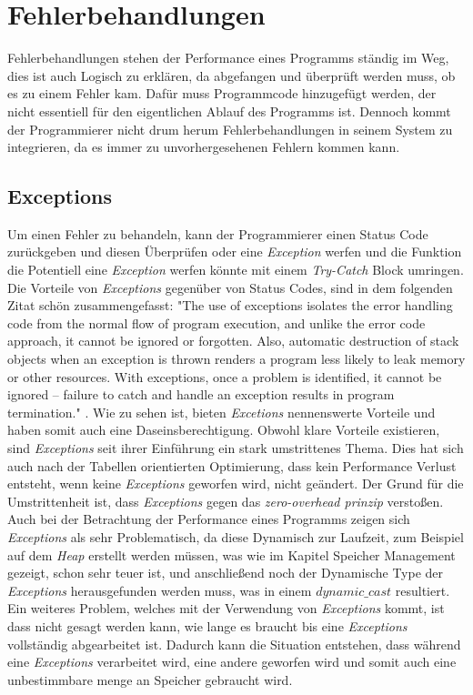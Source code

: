 \section{Fehlerbehandlungen}
Fehlerbehandlungen stehen der Performance eines Programms ständig im Weg, dies ist auch Logisch zu erklären, da abgefangen und überprüft werden muss, ob es zu einem Fehler kam. Dafür muss Programmcode hinzugefügt werden, der nicht essentiell für den eigentlichen Ablauf des Programms ist. Dennoch kommt der Programmierer nicht drum herum Fehlerbehandlungen in seinem System zu integrieren, da es immer zu unvorhergesehenen Fehlern kommen kann.

\subsection{Exceptions}
Um einen Fehler zu behandeln, kann der Programmierer einen Status Code zurückgeben und diesen Überprüfen oder eine \emph{Exception} werfen und die Funktion die Potentiell eine \emph{Exception} werfen könnte mit einem \emph{Try-Catch} Block umringen. Die Vorteile von \emph{Exceptions} gegenüber von Status Codes, sind in dem folgenden Zitat schön zusammengefasst: "The use of exceptions isolates the error handling code from the normal flow of program execution, and unlike the error code approach, it cannot be ignored or forgotten. Also, automatic destruction of stack objects when an exception is thrown renders a program less likely to leak memory or other resources. With exceptions, once a problem is identified, it cannot be ignored – failure to catch and handle an exception results in program termination." \cite{TechnicalReport}. Wie zu sehen ist, bieten \emph{Excetions} nennenswerte Vorteile und haben somit auch eine Daseinsberechtigung.
\newline
\newline
Obwohl klare Vorteile existieren, sind \emph{Exceptions} seit ihrer Einführung ein stark umstrittenes Thema. Dies hat sich auch nach der Tabellen orientierten Optimierung, dass kein Performance Verlust entsteht, wenn keine \emph{Exceptions} geworfen wird, nicht geändert. Der Grund für die Umstrittenheit ist, dass \emph{Exceptions} gegen das \emph{zero-overhead prinzip} verstoßen. Auch bei der Betrachtung der Performance eines Programms zeigen sich \emph{Exceptions} als sehr Problematisch, da  diese Dynamisch zur Laufzeit, zum Beispiel auf dem \emph{Heap} erstellt werden müssen, was wie im Kapitel Speicher Management gezeigt, schon sehr teuer ist, und anschließend noch der Dynamische Type der \emph{Exceptions} herausgefunden werden muss, was in einem \emph{$dynamic\_cast$} resultiert. Ein weiteres Problem, welches mit der Verwendung von \emph{Exceptions} kommt, ist dass nicht gesagt werden kann, wie lange es braucht bis eine \emph{Exceptions} vollständig abgearbeitet ist. Dadurch kann die Situation entstehen, dass während eine \emph{Exceptions} verarbeitet wird, eine andere geworfen wird und somit auch eine unbestimmbare menge an Speicher gebraucht wird.\cite{HandsOn}

